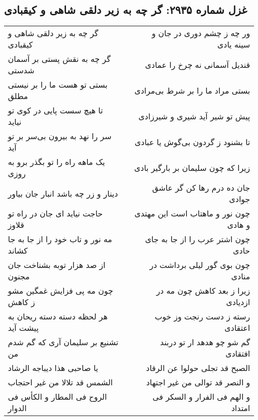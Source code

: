\begin{center}
\section*{غزل شماره ۲۹۳۵: گر چه به زیر دلقی شاهی و کیقبادی}
\label{sec:2935}
\begin{longtable}{l p{0.5cm} r}
گر چه به زیر دلقی شاهی و کیقبادی
&&
ور چه ز چشم دوری در جان و سینه یادی
\\
گر چه به نقش پستی بر آسمان شدستی
&&
قندیل آسمانی نه چرخ را عمادی
\\
بستی تو هست ما را بر نیستی مطلق
&&
بستی مراد ما را بر شرط بی‌مرادی
\\
تا هیچ سست پایی در کوی تو نیاید
&&
پیش تو شیر آید شیری و شیرزادی
\\
سر را نهد به بیرون بی‌سر بر تو آید
&&
تا بشنود ز گردون بی‌گوش یا عبادی
\\
یک ماهه راه را تو بگذر برو به روزی
&&
زیرا که چون سلیمان بر بارگیر بادی
\\
دینار و زر چه باشد انبار جان بیاور
&&
جان ده درم رها کن گر عاشق جوادی
\\
حاجت نیاید ای جان در راه تو قلاوز
&&
چون نور و ماهتاب است این مهتدی و هادی
\\
مه نور و تاب خود را از جا به جا کشاند
&&
چون اشتر عرب را از جا به جای حادی
\\
از صد هزار توبه بشناخت جان مجنون
&&
چون بوی گور لیلی برداشت در منادی
\\
چون مه پی فزایش غمگین مشو ز کاهش
&&
زیرا ز بعد کاهش چون مه در ازدیادی
\\
هر لحظه دسته دسته ریحان به پیشت آید
&&
رسته ز دست رنجت وز خوب اعتقادی
\\
تشنیع بر سلیمان آری که گم شدم من
&&
گم شو چو هدهد ار تو دربند افتقادی
\\
یا صاحبی هذا دیباجه الرشاد
&&
الصبح قد تجلی حولوا عن الرقاد
\\
الشمس قد تلالا من غیر احتجاب
&&
و النصر قد توالی من غیر اجتهاد
\\
الروح فی المطار و الکأس فی الدوار
&&
و الهم فی الفرار و السکر فی امتداد
\\
\end{longtable}
\end{center}
